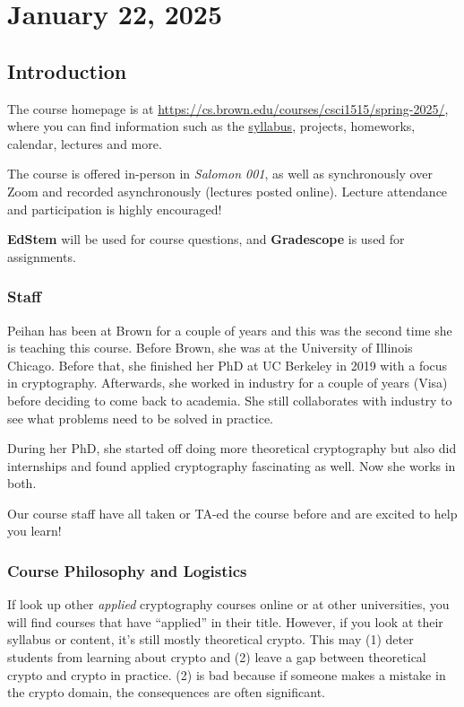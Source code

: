 \section{January 22, 2025}
\label{20250122}

\subsection{Introduction}
The course homepage is at \url{https://cs.brown.edu/courses/csci1515/spring-2025/}, where you can find information such as the \href{https://docs.google.com/document/d/14G3OhOOvd6b84vhYAXK9slAUbNgQte-34sGe9bhMOYA/edit?usp=sharing}{syllabus}, projects, homeworks, calendar, lectures and more.

The course is offered in-person in \emph{Salomon 001}, as well as synchronously over Zoom and recorded asynchronously (lectures posted online). Lecture attendance and participation is highly encouraged!

\textbf{EdStem} will be used for course questions, and \textbf{Gradescope} is used for assignments.

\subsubsection{Staff}

Peihan has been at Brown for a couple of years and this was the second time she is teaching this course. Before Brown, she was at the University of Illinois Chicago. Before that, she finished her PhD at UC Berkeley in 2019 with a focus in cryptography. Afterwards, she worked in industry for a couple of years (Visa) before deciding to come back to academia. She still collaborates with industry to see what problems need to be solved in practice.

During her PhD, she started off doing more theoretical cryptography but also did internships and found applied cryptography fascinating as well. Now she works in both.

Our course staff have all taken or TA-ed the course before and are excited to help you learn!

\subsubsection{Course Philosophy and Logistics}

If look up other \emph{applied} cryptography courses online or at other universities, you will find courses that have ``applied'' in their title. However, if you look at their syllabus or content, it's still mostly theoretical crypto. This may (1) deter students from learning about crypto and (2) leave a gap between theoretical crypto and crypto in practice. (2) is bad because if someone makes a mistake in the crypto domain, the consequences are often significant.

